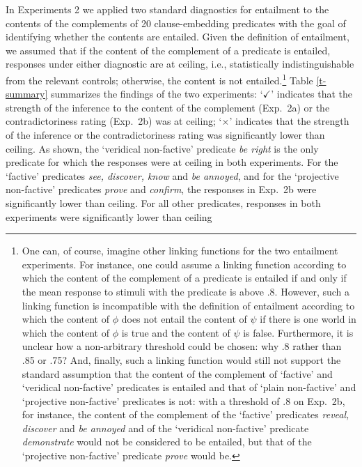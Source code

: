 \documentclass[11pt,fleqn]{article}
\newcommand{\6}{\mbox{$[\hspace*{-.6mm}[$}}
\newcommand{\9}{\mbox{$]\hspace*{-.6mm}]$}}
\begin{document}
{In Experiments 2 we applied two standard diagnostics for entailment to the contents of the complements of 20 clause-embedding predicates with the goal of identifying whether the contents are entailed. Given the definition of entailment, we assumed that if the content of the complement of a predicate is entailed, responses under either diagnostic are at ceiling, i.e., statistically indistinguishable from the relevant controls; otherwise, the content is not entailed.\footnote{One can, of course, imagine other linking functions for the two entailment experiments. For instance, one could assume a linking function according to which the content of the complement of a predicate is entailed if and only if the mean response to stimuli with the predicate is above .8. However, such a linking function is incompatible with the definition of entailment according to which the content of $\phi$ does not entail the content of $\psi$ if there is one world in which the content of $\phi$ is true and the content of $\psi$ is false. Furthermore, it is unclear how a non-arbitrary threshold could be chosen: why .8 rather than .85 or .75? And, finally, such a linking function would still not support the standard assumption that the content of the complement of `factive' and `veridical non-factive' predicates is entailed and that of `plain non-factive' and `projective non-factive' predicates is not: with a threshold of .8 on Exp.~2b, for instance, the content of the complement of the `factive' predicates {\em reveal, discover} and {\em be annoyed} and of the `veridical non-factive' predicate {\em demonstrate} would not be considered to be entailed, but that of the `projective non-factive' predicate {\em prove} would be.} Table \ref{t-summary} summarizes the findings of the two experiments: `$\checkmark$' indicates that the strength of the inference to the content of the complement (Exp.~2a) or the contradictoriness rating (Exp.~2b) was at ceiling; `$\times$' indicates that the strength of the inference or the contradictoriness rating was significantly lower than ceiling. As shown, the `veridical non-factive' predicate {\em be right} is the only predicate for which the responses were at ceiling in both experiments. For the `factive' predicates {\em see, discover, know} and {\em be annoyed}, and for the `projective non-factive' predicates {\em prove} and {\em confirm}, the responses in Exp.~2b were significantly lower than ceiling. For all other predicates, responses in both experiments were significantly lower than ceiling


\begin{table}[h!]


\end{table}}
\end{document}
